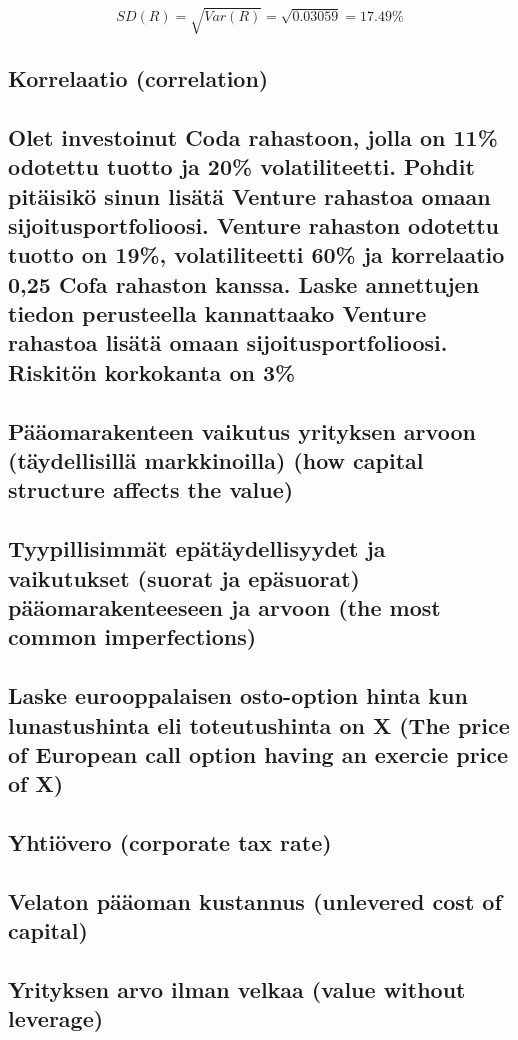 \documentclass[a4paper]{article}
\begin{document}
\[
SD(R) = \sqrt{Var(R)} = \sqrt{0.03059} = 17.49\%
\]

\subsection{Korrelaatio (correlation)}



\subsection{Olet investoinut Coda rahastoon, jolla on 11\% odotettu tuotto ja 20\% volatiliteetti. Pohdit pitäisikö sinun lisätä Venture rahastoa omaan sijoitusportfolioosi. Venture rahaston odotettu tuotto on 19\%, volatiliteetti 60\% ja korrelaatio 0,25 Cofa rahaston kanssa. Laske annettujen tiedon perusteella kannattaako Venture rahastoa lisätä omaan sijoitusportfolioosi. Riskitön korkokanta on 3\%}

\subsection{Pääomarakenteen vaikutus yrityksen arvoon (täydellisillä markkinoilla) (how capital structure affects the value)}

\subsection{Tyypillisimmät epätäydellisyydet ja vaikutukset (suorat ja epäsuorat) pääomarakenteeseen ja arvoon
(the most common imperfections)}

\subsection{Laske eurooppalaisen osto-option hinta kun lunastushinta eli toteutushinta on X (The price of European call option having an exercie price of X)}

\subsection{Yhtiövero (corporate tax rate)}

\subsection{Velaton pääoman kustannus (unlevered cost of capital)}

\subsection{Yrityksen arvo ilman velkaa (value without leverage)}
\end{document}
